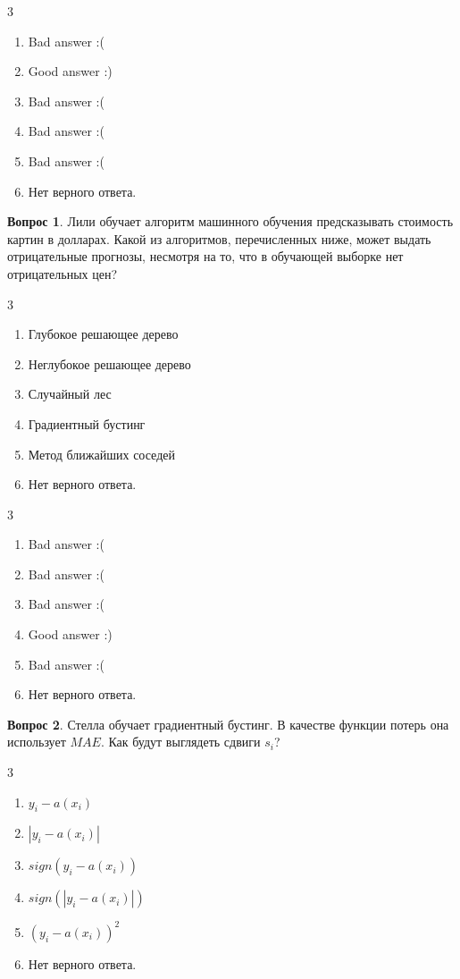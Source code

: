 \documentclass[12pt]{article}
\newenvironment{answerlist}[1][3]{
\begin{multicols}{#1}

\begin{enumerate}[label=\fbox{\emph{\Alph*}},ref=\emph{\alph*}]
}
{
\item Нет верного ответа.
\end{enumerate}
\end{multicols}
}
\theoremstyle{definition}
\newtheorem{question}{Вопрос}
\begin{document}
\begin{solution}
\begin{answerlist}
  \item Bad answer :(
  \item Good answer :) %
  \item Bad answer :(
  \item Bad answer :(
  \item Bad answer :(
\end{answerlist}
\end{solution}

\begin{question}
Лили обучает алгоритм машинного обучения предсказывать стоимость картин в долларах. Какой из алгоритмов, перечисленных ниже, может выдать отрицательные прогнозы, несмотря на то, что в обучающей выборке нет отрицательных цен? 
\begin{answerlist}
  \item  Глубокое решающее дерево
  \item  Неглубокое решающее дерево
  \item  Случайный лес
  \item  Градиентный бустинг
  \item  Метод ближайших соседей
\end{answerlist}
\end{question}

\begin{solution}
\begin{answerlist}
  \item Bad answer :(
  \item Bad answer :(
  \item Bad answer :(
  \item Good answer :)
  \item Bad answer :(
\end{answerlist}
\end{solution}


\begin{question}
Стелла обучает градиентный бустинг. В качестве функции потерь она использует $MAE$. Как будут выглядеть сдвиги $s_i$? 
\begin{answerlist}
  \item  $y_i - a(x_i)$
  \item  $|y_i - a(x_i)|$
  \item  $sign(y_i - a(x_i))$
  \item  $sign(|y_i - a(x_i)|)$
  \item  $(y_i - a(x_i))^2$
\end{answerlist}
\end{question}
\end{document}
